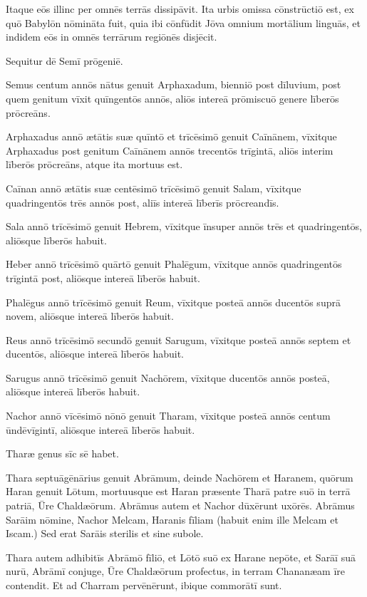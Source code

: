 \Versus Itaque eōs illinc per omnēs terrās dissipāvit. Ita urbis omissa cōnstrūctiō est,
\Versus ex quō Babylōn nōmināta fuit, quia ibi cōnfūdit Jōva omnium mortālium linguās, et indidem eōs in omnēs terrārum regiōnēs disjēcit.

\Versus Sequitur dē Semī prōgeniē.

Semus centum annōs nātus genuit Arphaxadum, bienniō post dīluvium,
\Versus post quem genitum vīxit quīngentōs annōs, aliōs intereā prōmiscuō genere līberōs prōcreāns.

\Versus Arphaxadus annō ætātis suæ quīntō et trīcēsimō genuit Caīnānem,
\Versus vīxitque Arphaxadus post genitum Caīnānem annōs trecentōs trīgintā, aliōs interim līberōs prōcreāns, atque ita mortuus est.

\Versus Caīnan annō ætātis suæ centēsimō trīcēsimō genuit Salam,
\Versus vīxitque quadringentōs trēs annōs post, aliīs intereā līberīs prōcreandīs.

\Versus Sala annō trīcēsimō genuit Hebrem,
\Versus vīxitque īnsuper annōs trēs et quadringentōs, aliōsque līberōs habuit.

\Versus Heber annō trīcēsimō quārtō genuit Phalēgum,
\Versus vīxitque annōs quadringentōs trīgintā post, aliōsque intereā līberōs habuit.

\Versus Phalēgus annō trīcēsimō genuit Reum,
\Versus vīxitque posteā annōs ducentōs suprā novem, aliōsque intereā līberōs habuit.

\Versus Reus annō trīcēsimō secundō genuit Sarugum,
\Versus vīxitque posteā annōs septem et ducentōs, aliōsque intereā līberōs habuit.

\Versus Sarugus annō trīcēsimō genuit Nachōrem,
\Versus vīxitque ducentōs annōs posteā, aliōsque intereā līberōs habuit.

\Versus Nachor annō vīcēsimō nōnō genuit Tharam,
\Versus vīxitque posteā annōs centum ūndēvīgintī, aliōsque intereā līberōs habuit.

\Versus Tharæ genus sīc sē habet.

Thara septuāgēnārius genuit Abrāmum, deinde Nachōrem et Haranem,
\Versus quōrum Haran genuit Lōtum,
\Versus mortuusque est Haran præsente Tharā patre suō in terrā patriā, Ūre Chaldæōrum.
\Versus Abrāmus autem et Nachor dūxērunt uxōrēs. Abrāmus Sarāim nōmine, Nachor Melcam, Haranis fīliam (habuit enim ille Melcam et Iscam.)
\Versus Sed erat Sarāis sterilis et sine subole.

\Versus Thara autem adhibitīs Abrāmō fīliō, et Lōtō suō ex Harane nepōte, et Sarāī suā nurū, Abrāmī conjuge, Ūre Chaldæōrum profectus, in terram Chananæam īre contendit. Et ad Charram pervēnērunt, ibique commorātī sunt.

